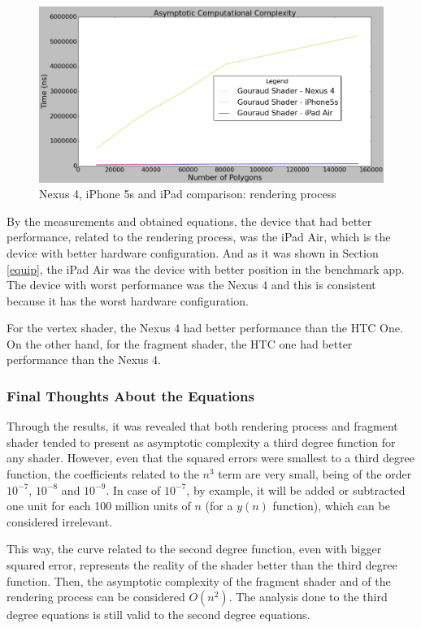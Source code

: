 \documentclass[10pt, conference, compsocconf]{IEEEtran}
\begin{document}
{	\begin{figure}[!t]
	\centering
		\includegraphics[keepaspectratio=true,scale=0.25]{figures/render_time_devices.png}
	\caption{Nexus 4, iPhone 5s and iPad comparison: rendering process}
	\label{nexus_ios}
	\end{figure}	

 By the measurements and obtained equations, the device that had better
performance, related to the rendering process, was the iPad Air, which is
the device with better hardware configuration. And as it was shown in 
Section \ref{equip}, the iPad Air was the device with better position in 
the benchmark app. The device with worst performance was the Nexus 4 and 
this is consistent because it has the worst hardware configuration.

For the vertex shader, the Nexus 4 had better performance than the HTC One.
On the other hand, for the fragment shader, the HTC one had better performance
than the Nexus 4.

\subsubsection{Final Thoughts About the Equations}

Through the results, it was revealed that both rendering process and fragment
shader tended to present as asymptotic complexity a third degree function
for any shader. However, even that the squared errors were smallest to a third degree function,
the coefficients related to the $n^3$ term are very small, being of the 
order $10^{-7}$, $10^{-8}$ and $10^{-9}$. In case of $10^{-7}$, by example, it will be added or subtracted one unit
for each 100 million units of $n$ (for a $y(n)$ function), 
which can be considered irrelevant.

 This way, the curve related to the second degree function, even with 
bigger squared error, represents the reality of the shader better than the
third degree function. Then, the asymptotic complexity of the fragment 
shader and of the rendering process can be considered $O(n^2)$. The analysis done to the third degree 
equations is still valid to the second degree equations.

}
\end{document}

